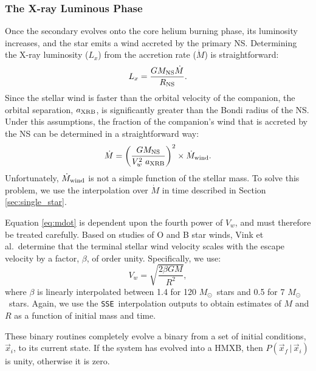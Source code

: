 \documentclass[12pt, preprint]{aastex}
\newcommand{\given}{\,|\,}
\newcommand{\Msun}{\ifmmode {M_{\odot}}\else${M_{\odot}}$\fi}
\newcommand{\sse}{{\tt SSE}}
\begin{document}
\subsubsection{The X-ray Luminous Phase} \label{sec:trans_XRB}

Once the secondary evolves onto the core helium burning phase, its luminosity increases, and the star emits a wind accreted by the primary NS. Determining the X-ray luminosity ($L_x$) from the accretion rate ($\dot{M}$) is straightforward: 
\begin{equation}
L_x = \frac{G M_{\rm NS} \dot{M}}{R_{\rm NS}}.
\end{equation}
Since the stellar wind is faster than the orbital velocity of the companion, the orbital separation, $a_{\rm XRB}$, is significantly greater than the Bondi radius of the NS. Under this assumptions, the fraction of the companion's wind that is accreted by the NS can be determined in a straightforward way:
\begin{equation}
\dot{M} = \left( \frac{G M_{\rm NS}}{V_w^2\ a_{\rm XRB}} \right)^2 \times \dot{M}_{\rm wind}. \label{eq:mdot}
\end{equation}
Unfortunately, $\dot{M}_{\rm wind}$ is not a simple function of the stellar mass. To solve this problem, we use the interpolation over $\dot{M}$ in time described in Section \ref{sec:single_star}. 

Equation \ref{eq:mdot} is dependent upon the fourth power of $V_w$, and must therefore be treated carefully. Based on studies of O and B star winds, Vink et al.\ determine that the terminal stellar wind velocity scales with the escape velocity by a factor, $\beta$, of order unity. Specifically, we use:
\begin{equation}
V_w = \sqrt{\frac{2 \beta G M}{R^2}},
\end{equation}
where $\beta$ is linearly interpolated between 1.4 for 120 \Msun\ stars and 0.5 for 7 \Msun\ stars. Again, we use the \sse\ interpolation outputs to obtain estimates of $M$ and $R$ as a function of initial mass and time.

These binary routines completely evolve a binary from a set of initial conditions, $\vec{x}_i$, to its current state. If the system has evolved into a HMXB, then $P(\vec{x}_f \given \vec{x}_i)$ is unity, otherwise it is zero.
\end{document}
